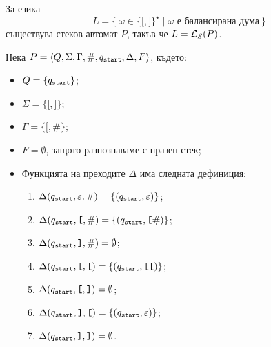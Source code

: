 \begin{example}
  За езика 
  \[L = \{\ \omega \in \{\texttt{[},\texttt{]}\}^\star \mid \omega\text{ е балансирана дума}\ \}\] съществува стеков автомат $P$, такъв че
  $L = \mathcal{L}_S(P)$.

  Нека $P = \langle{Q,\Sigma,\Gamma,\#,q_{\texttt{start}},\Delta,F}\rangle$, където:
  \begin{itemize}
  \item 
    $Q = \{q_{\texttt{start}}\}$;
  \item
    $\Sigma = \{\texttt{[},\texttt{]}\}$;
  \item
    $\Gamma = \{\texttt{[}, \#\}$;
  \item
    $F = \emptyset$, защото разпознаваме с празен стек;
  \item
    Функцията на преходите $\Delta$ има следната дефиниция:
    \begin{enumerate}[(1)]
    \item 
      $\Delta(q_{\texttt{start}}, \varepsilon, \#) = \{(q_{\texttt{start}}, \varepsilon)\}$;
    \item
      $\Delta(q_{\texttt{start}}, \texttt{[}, \#) = \{(q_{\texttt{start}}, \texttt{[}\#)\}$;
    \item
      $\Delta(q_{\texttt{start}}, \texttt{]}, \#) = \emptyset$;
    \item
      $\Delta(q_{\texttt{start}}, \texttt{[}, \texttt{[}) = \{(q_{\texttt{start}}, \texttt{[[})\}$;
    \item
      $\Delta(q_{\texttt{start}}, \texttt{[}, \texttt{]}) = \emptyset$;
    \item
      $\Delta(q_{\texttt{start}}, \texttt{]}, \texttt{[}) = \{(q_{\texttt{start}}, \varepsilon)\}$;
    \item
      $\Delta(q_{\texttt{start}}, \texttt{]}, \texttt{]}) = \emptyset$.
    \end{enumerate}
  \end{itemize}  


\end{example}
